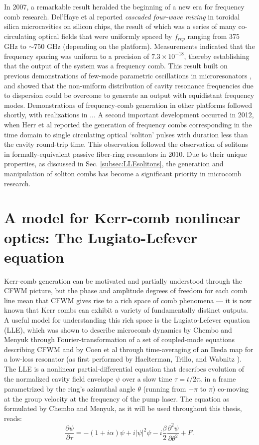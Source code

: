 In 2007, a remarkable result heralded the beginning of a new era for frequency comb research. Del'Haye et al reported \textit{cascaded four-wave mixing} in toroidal silica microcavities on silicon chips, the result of which was a series of many co-circulating optical fields that were uniformly spaced by $f_{rep}$ ranging from 375 GHz to $\sim$750 GHz (depending on the platform)\cite{DelHaye2007}. Measurements indicated that the frequency spacing was uniform to a precision of $7.3 \times 10^{-18}$, thereby establishing that the output of the system was a frequency comb. This result built on previous demonstrations of few-mode parametric oscillations in microresonators \cite{Kippenberg2004, Savchenkov2004,Agha2007}, and showed that the non-uniform distribution of cavity resonance frequencies due to dispersion could be overcome to generate an output with equidistant frequency modes. Demonstrations of frequency-comb generation in other platforms followed shortly, with realizations in ... A second important development occurred in 2012, when Herr et al reported the generation of frequency combs corresponding in the time domain to single circulating optical `soliton' pulses with duration less than the cavity round-trip time. This observation followed the observation of solitons in formally-equivalent passive fiber-ring resonators in 2010\cite{Leo2010}. Due to their unique properties, as discussed in Sec. \ref{subsec:LLEsolitons}, the generation and manipulation of soliton combs has become a significant priority in microcomb research. 

\section{A model for Kerr-comb nonlinear optics: The Lugiato-Lefever equation}

Kerr-comb generation can be motivated and partially understood through the CFWM picture, but the phase and amplitude degrees of freedom for each comb line mean that CFWM gives rise to a rich space of comb phenomena --- it is now known that Kerr combs can exhibit a variety of fundamentally distinct outputs.  A useful model for understanding this rich space is the Lugiato-Lefever equation (LLE), which was shown to describe microcomb dynamics by Chembo and Menyuk \cite{Chembo2013} through Fourier-transformation of a set of coupled-mode equations describing CFWM and by Coen et al \cite{Coen2013} through time-averaging of an Ikeda map for a low-loss resonator (as first performed by Haelterman, Trillo, and Wabnitz \cite{Haelterman1992}).  The LLE is a nonlinear partial-differential equation that describes evolution of the normalized cavity field envelope $\psi$ over a slow time $\tau=t/2\tau_\gamma$ in a frame parametrized by the ring's azimuthal angle $\theta$ (running from $-\pi$ to $\pi$) co-moving at the group velocity at the frequency of the pump laser. The equation as formulated by Chembo and Menyuk, as it will be used throughout this thesis, reads:
\begin{equation}
\frac{\partial \psi}{\partial \tau}=-(1+i \alpha) \psi + i|\psi|^2 \psi -i \frac{\beta}{2} \frac{\partial^2 \psi}{\partial \theta^2} +F. \label{eq:LLE}
\end{equation}

